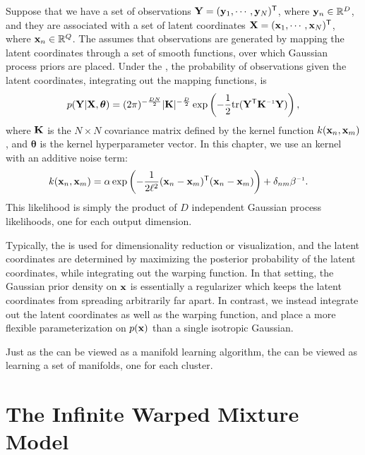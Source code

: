 Suppose that we have a set of observations
$\mathbf{Y} = ({\bf{y}}_1,\cdots,{\bf{y}}_N)^{\mathsf{T}}$,
where ${\bf{y}}_n \in {\mathbb R}^D$,
and they are associated with a set of latent coordinates
$\mathbf{X} = ({\bf{x}}_1,\cdots,{\bf{x}}_{N})^{\mathsf{T}}$,
where ${\bf{x}}_n \in {\mathbb R}^Q$.
The \gplvm{} assumes that observations are generated by mapping the latent coordinates through a set of smooth functions, over which Gaussian process priors are placed.
Under the \gplvm{}, the probability of observations given the latent coordinates, integrating out the mapping functions, is
\begin{align}
p(\vY | \vX,\bm{\theta})  = (2 \pi)^{-\frac{DN}{2}}  |\vK|^{-\frac{D}{2}} \exp \left( -\frac{1}{2} {\rm tr}( \vY\tra \vK\inv \vY) \right),
\label{eq:py_x}
\end{align}
where $\mathbf{K}$ is the $N \times N$ covariance matrix defined 
by the kernel function $k({\bf{x}}_{n},{\bf{x}}_{m})$,
and $\bm{\theta}$ is the kernel hyperparameter vector.
In this chapter, we use an \kSE kernel with an additive noise term:
\begin{align}
k(\vx_{n},\vx_{m}) &= \alpha \exp\left( - \frac{1}{2 \ell^2}(\vx_n - \vx_m)\tra (\vx_n - \vx_m) \right) 
+ \delta_{nm} \beta\inv.
\end{align}
This likelihood is simply the product of $D$ independent Gaussian process likelihoods, one for each output dimension.

Typically, the \gplvm{} is used for dimensionality reduction or visualization, and the latent coordinates are determined by maximizing the posterior probability of the latent coordinates, while integrating out the warping function.  
In that setting, the Gaussian prior density on ${\bf{x}}$ is essentially a regularizer which keeps the latent coordinates from spreading arbitrarily far apart.  
In contrast, we instead integrate out the latent coordinates as well as the warping function, and place a more flexible parameterization on $p({\bf{x}})$ than a single isotropic Gaussian.

Just as the \gplvm{} can be viewed as a manifold learning algorithm, the \iwmm{} can be viewed as learning a set of manifolds, one for each cluster.





\section{The Infinite Warped Mixture Model}

